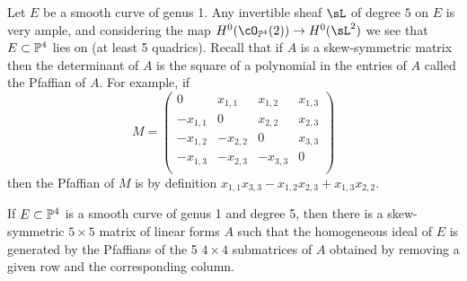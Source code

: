 \begin{fact}
Let $E$ be a smooth curve of genus 1. Any invertible sheaf $\sL$ of degree $5$ on $E$ is very ample, and considering the map $H^0(\op42) \to H^0(\sL^2)$
we see that $E\subset \PP^4$ lies on (at least 5 quadrics). 
Recall that if $A$ is a skew-symmetric matrix
then the determinant of $A$ is the square of a polynomial in the entries of $A$ called the Pfaffian of $A$. For example, if
$$
M = \begin{pmatrix}
0&x_{1,1}&x_{1,2}&x_{1,3}\\
-x_{1,1}&0&x_{2,2}&x_{2,3}\\
-x_{1,2}&-x_{2,2}&0&x_{3,3}\\
-x_{1,3}&-x_{2,3}&-x_{3,3}&0\\
\end{pmatrix}
$$
then the Pfaffian of $M$ is by definition $x_{1,1}x_{3,3}-x_{1,2}x_{2,3}+x_{1,3}x_{2,2}$.

\begin{proposition} \cite[Theorem11]{Eisenbud1995}
If $E\subset \PP^4$ is a smooth curve of genus 1 and degree 5, then there is a skew-symmetric $5\times 5$ matrix of linear forms $A$
such that the homogeneous ideal of $E$ is generated by the  Pfaffians of the 5 $4\times 4$ submatrices of $A$ obtained by removing
a given row and the corresponding column.
\end{proposition}
\end{fact}



